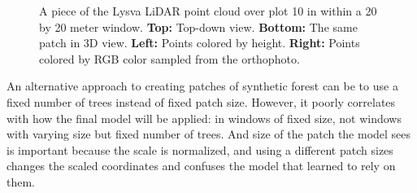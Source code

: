 \begin{figure}
\caption[Visualisation of a patch of a real forest.]{\label{fig-lysva-plot-window-example}A piece of the Lysva
LiDAR point cloud over plot 10 in within a 20 by 20 meter window.
\textbf{Top:} Top-down view. \textbf{Bottom:} The same patch in 3D view.
\textbf{Left:} Points colored by height. \textbf{Right:} Points colored
by RGB color sampled from the orthophoto.}
\end{figure}

An alternative approach to creating patches of synthetic forest can be to use a fixed number of trees instead of fixed patch size.
However, it poorly correlates with how the final model will be applied: in windows of fixed size, not windows with varying size but fixed number of trees.
And size of the patch the model sees is important because the scale is normalized, and using a different patch sizes changes the scaled coordinates and confuses the model that learned to rely on them.

